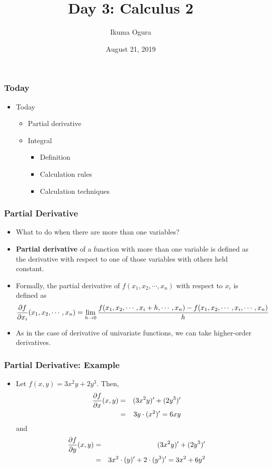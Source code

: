 \documentclass[pdflatex, 12pt]{beamer}
\title[Math Camp]{Day 3: Calculus 2}
\author[Ikuma Ogura]{Ikuma Ogura}
\institute[Georgetown]{Ph.D. student, Department of Government, Georgetown University}
\date[August 21, 2019]{August 21, 2019}
\begin{document}
\begin{frame}
\frametitle{}
\titlepage
\end{frame}

\begin{frame}
\frametitle{Today}
\begin{itemize}
\item Today
 \begin{itemize}
 \item Partial derivative
 \item Integral
  \begin{itemize}
  \item Definition
  \item Calculation rules
  \item Calculation techniques
  \end{itemize}
 \end{itemize}
\end{itemize}
\end{frame}

\begin{frame}
\frametitle{Partial Derivative}
\begin{itemize}
\item What to do when there are more than one variables?
\vspace{0.4cm}
\item \textbf{Partial derivative} of a function with more than one variable is defined as the derivative with respect to one of those variables with others held constant.
\vspace{0.4cm}
\item Formally, the partial derivative of $f(x_1, x_2, \cdots, x_n)$ with respect to $x_i$ is defined as
 {\scriptsize
 \begin{equation} 
 \frac{\partial f}{\partial x_i} (x_1, x_2, \cdots, x_n) = \lim_{h \to 0} \frac{f(x_1, x_2, \cdots, x_i + h, \cdots, x_n) - f(x_1, x_2, \cdots, x_i, \cdots, x_n)}{h} \notag
 \end{equation}  
 }
\vspace{0.2cm}
\item As in the case of derivative of univariate functions, we can take higher-order derivatives. 
\end{itemize}
\end{frame}

\begin{frame}
\frametitle{Partial Derivative: Example}
\begin{itemize}
\item Let $f(x, y) = 3x^2y + 2y^3$. Then,
 \begin{eqnarray}
 \frac{\partial f}{\partial x}(x, y) &=& (3x^2y)' + (2y^3)' \notag \\
 &=& 3y \cdot (x^2)' = 6xy \notag 
 \end{eqnarray}
 and 
 \begin{eqnarray}
 \frac{\partial f}{\partial y}(x, y) &=& (3x^2y)' + (2y^3)' \notag \\
 &=& 3x^2 \cdot (y)' + 2 \cdot (y^3)' = 3x^2 + 6y^2 \notag 
 \end{eqnarray}
\end{itemize}
\end{frame}
\end{document}
